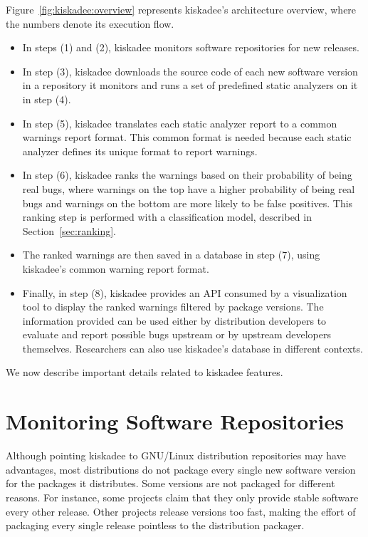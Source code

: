 Figure~\ref{fig:kiskadee:overview} represents kiskadee's architecture overview,
where the numbers denote its execution flow.
\begin{itemize}
  \item In steps (1) and (2), kiskadee
monitors software repositories for new releases.
    \item In step (3), kiskadee
downloads the source code of each new software version in a repository it
monitors and runs a set of predefined static analyzers on it in step (4).
    \item In step (5),
kiskadee translates each static analyzer report to a common warnings report format.
This common format is needed because each static analyzer defines
its unique format to report warnings.
    \item In step (6), kiskadee ranks the warnings
based on their probability of being real bugs, where warnings on the top have a
higher probability of being real bugs and warnings on the bottom are more
likely to be false positives. This ranking step is performed with a
classification model, described in Section~\ref{sec:ranking}.
    \item The ranked
warnings are then saved in a database in step (7), using kiskadee's common
warning report format.  
    \item Finally, in step (8), kiskadee provides an API consumed
by a visualization tool to display the ranked warnings filtered by package
versions. The information provided can be used either by distribution developers to
evaluate and report possible bugs upstream or by upstream developers
themselves. Researchers can also use kiskadee's database in different contexts.
\end{itemize}

We now describe important details related to kiskadee features.

\section{Monitoring Software Repositories}

Although pointing kiskadee to GNU/Linux distribution repositories may have
advantages, most distributions do not package every single new software version
for the packages it distributes. Some versions are not packaged for different
reasons. For instance, some projects claim that they only provide stable
software every other release. Other projects release versions too fast, making
the effort of packaging every single release pointless to the distribution
packager.

